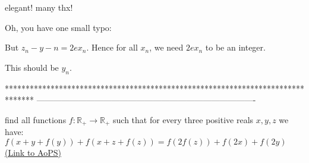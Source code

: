 \begin{solution}
	elegant!
many thx!
\end{solution}



\begin{solution}
	Oh, you have one small typo:
\begin{tcolorbox}
But $z_n - y-n = 2ex_n$. Hence for all $x_n$, we need $2ex_n$ to be an integer.
\end{tcolorbox}
This should be $y_n$.
\end{solution}
*******************************************************************************
-------------------------------------------------------------------------------

\begin{problem}
	find all functions $f:\mathbb{R}_+\rightarrow \mathbb{R}_+$ such that for every three positive reals $x,y,z$ we have:
$f(x+y+f(y))+f(x+z+f(z))=f(2f(z))+f(2x)+f(2y)$
	\flushright \href{https://artofproblemsolving.com/community/c6h472497}{(Link to AoPS)}
\end{problem}



